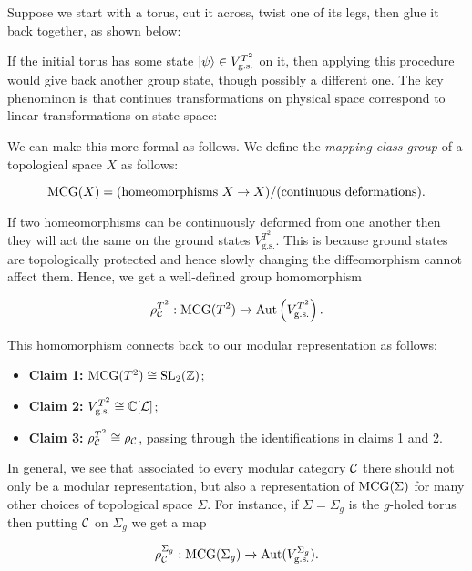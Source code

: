 Suppose we start with a torus, cut it across, twist one of its legs, then glue it back together, as shown below:


If the initial torus has some state $\ket{\psi}\in V_{\text{g.s.}}^{T^2}$ on it, then applying this procedure would give back another group state, though possibly a different one. The key phenominon is that continues transformations on physical space correspond to linear transformations on state space:


We can make this more formal as follows. We define the {\em mapping class group} of a topological space $X$ as follows:

$$\operatorname{MCG}(X)=(\text{homeomorphisms $X\to X$})/(\text{continuous deformations}).$$

If two homeomorphisms can be continuously deformed from one another then they will act the same on the ground states $V_{\text{g.s.}}^{T^2}$. This is because ground states are topologically protected and hence slowly changing the diffeomorphism cannot affect them. Hence, we get a well-defined group homomorphism

$$\rho_{{\mathcal C}}^{T^2}:\operatorname{MCG}(T^2)\xrightarrow{}\operatorname{Aut}\left(V_{\text{g.s.}}^{T^2}\right).$$

This homomorphism connects back to our modular representation as follows:

\begin{itemize}
\item \textbf{Claim 1:} $\operatorname{MCG}(T^2)\cong \operatorname{SL}_2({\mathbb Z})$;

\item \textbf{Claim 2:} $V_{\text{g.s.}}^{T^2}\cong {\mathbb C}[{\mathcal L}]$;

\item \textbf{Claim 3:} $\rho_{{\mathcal C}}^{T^2}\cong \rho_{{\mathcal C}}$, passing through the identifications in claims 1 and 2.
\end{itemize}

In general, we see that associated to every modular category ${\mathcal C}$ there should not only be a modular representation, but also a representation of $\operatorname{MCG}(\Sigma)$ for many other choices of topological space $\Sigma$. For instance, if $\Sigma=\Sigma_g$ is the $g$-holed torus then putting ${\mathcal C}$ on $\Sigma_g$ we get a map

$$\rho_{{\mathcal C}}^{\Sigma_g}:\operatorname{MCG}(\Sigma_g)\xrightarrow{}\operatorname{Aut}(V_{\text{g.s.}}^{\Sigma_g}).$$


